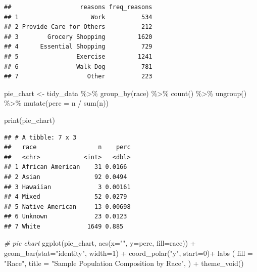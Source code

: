 \documentclass[
  11 pt,
]{article}
\newenvironment{Shaded}{\begin{snugshade}}{\end{snugshade}}
\newcommand{\AttributeTok}[1]{\textcolor[rgb]{0.77,0.63,0.00}{#1}}
\newcommand{\CommentTok}[1]{\textcolor[rgb]{0.56,0.35,0.01}{\textit{#1}}}
\newcommand{\DecValTok}[1]{\textcolor[rgb]{0.00,0.00,0.81}{#1}}
\newcommand{\FunctionTok}[1]{\textcolor[rgb]{0.00,0.00,0.00}{#1}}
\newcommand{\NormalTok}[1]{#1}
\newcommand{\OtherTok}[1]{\textcolor[rgb]{0.56,0.35,0.01}{#1}}
\newcommand{\SpecialCharTok}[1]{\textcolor[rgb]{0.00,0.00,0.00}{#1}}
\newcommand{\StringTok}[1]{\textcolor[rgb]{0.31,0.60,0.02}{#1}}
\begin{document}
\begin{verbatim}
##                   reasons freq_reasons
## 1                    Work          534
## 2 Provide Care for Others          212
## 3        Grocery Shopping         1620
## 4      Essential Shopping          729
## 5                Exercise         1241
## 6                Walk Dog          781
## 7                   Other          223
\end{verbatim}

\begin{Shaded}
\begin{Highlighting}[]
\NormalTok{pie\_chart }\OtherTok{\textless{}{-}}\NormalTok{ tidy\_data }\SpecialCharTok{\%\textgreater{}\%}
  \FunctionTok{group\_by}\NormalTok{(race) }\SpecialCharTok{\%\textgreater{}\%}
  \FunctionTok{count}\NormalTok{() }\SpecialCharTok{\%\textgreater{}\%}
  \FunctionTok{ungroup}\NormalTok{() }\SpecialCharTok{\%\textgreater{}\%}
  \FunctionTok{mutate}\NormalTok{(}\AttributeTok{perc =}\NormalTok{ n }\SpecialCharTok{/} \FunctionTok{sum}\NormalTok{(n))}

\FunctionTok{print}\NormalTok{(pie\_chart)}
\end{Highlighting}
\end{Shaded}

\begin{verbatim}
## # A tibble: 7 x 3
##   race                 n    perc
##   <chr>            <int>   <dbl>
## 1 African American    31 0.0166 
## 2 Asian               92 0.0494 
## 3 Hawaiian             3 0.00161
## 4 Mixed               52 0.0279 
## 5 Native American     13 0.00698
## 6 Unknown             23 0.0123 
## 7 White             1649 0.885
\end{verbatim}

\begin{Shaded}
\begin{Highlighting}[]
\CommentTok{\# pie chart}
\FunctionTok{ggplot}\NormalTok{(pie\_chart, }\FunctionTok{aes}\NormalTok{(}\AttributeTok{x=}\StringTok{""}\NormalTok{, }\AttributeTok{y=}\NormalTok{perc, }\AttributeTok{fill=}\NormalTok{race)) }\SpecialCharTok{+}
  \FunctionTok{geom\_bar}\NormalTok{(}\AttributeTok{stat=}\StringTok{"identity"}\NormalTok{, }\AttributeTok{width=}\DecValTok{1}\NormalTok{) }\SpecialCharTok{+}
  \FunctionTok{coord\_polar}\NormalTok{(}\StringTok{"y"}\NormalTok{, }\AttributeTok{start=}\DecValTok{0}\NormalTok{)}\SpecialCharTok{+}
  \FunctionTok{labs}\NormalTok{ (}
    \AttributeTok{fill =} \StringTok{"Race"}\NormalTok{,}
    \AttributeTok{title =} \StringTok{"Sample Population Composition by Race"}\NormalTok{,}
\NormalTok{    ) }\SpecialCharTok{+}
  \FunctionTok{theme\_void}\NormalTok{()}
\end{Highlighting}
\end{Shaded}
\end{document}
